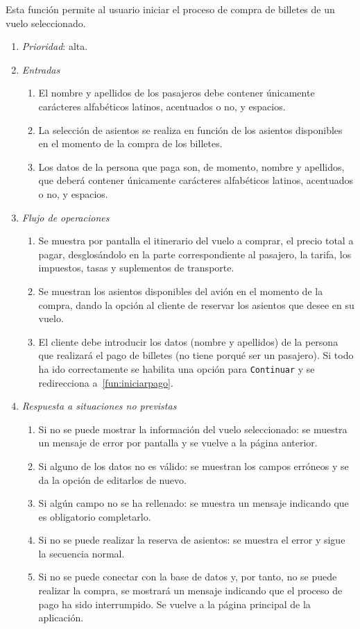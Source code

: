 

 \label{fun:comprarbillete}
	Esta función permite al usuario iniciar el proceso de compra de billetes de un vuelo seleccionado.		

	\begin{enumerate}
		\item \textit{Prioridad}: alta.	
		\item \textit{Entradas}
			\begin{enumerate}
				\item El nombre y apellidos de los pasajeros debe contener únicamente carácteres alfabéticos latinos, acentuados o no, y espacios.
				\item La selección de asientos se realiza en función de los asientos disponibles en el momento de la compra de los billetes.
				\item Los datos de la persona que paga son, de momento, nombre y apellidos,  que deberá contener únicamente carácteres alfabéticos latinos, acentuados o no, y espacios.							
			\end{enumerate}
		\item \textit{Flujo de operaciones}
			\begin{enumerate}
				\item Se muestra por pantalla el itinerario del vuelo a comprar, el precio total a pagar, desglosándolo en la parte correspondiente al pasajero, la tarifa, los impuestos, tasas y suplementos de transporte.
				\item Se muestran los asientos disponibles del avión en el momento de la compra, dando la opción al cliente de reservar los asientos que desee en su vuelo.
				\item El cliente debe introducir los datos (nombre y apellidos) de la persona que realizará el pago de billetes (no tiene porqué ser un pasajero). Si todo ha ido correctamente se habilita una opción para \verb|Continuar| y se redirecciona a~\ref{fun:iniciarpago}.
			\end{enumerate}
		\item \textit{Respuesta a situaciones no previstas}
			\begin{enumerate}
				\item Si no se puede mostrar la información del vuelo seleccionado: se muestra un mensaje de error por pantalla y se vuelve a la página anterior.
				\item Si alguno de los datos no es válido: se muestran los campos erróneos y se da la opción de editarlos de nuevo.
				\item Si algún campo no se ha rellenado: se muestra un mensaje indicando que es obligatorio completarlo.
				\item Si no se puede realizar la reserva de asientos: se muestra el error y sigue la secuencia normal.
				\item Si no se puede conectar con la base de datos y, por tanto, no se puede realizar la compra,  se mostrará un mensaje indicando que el proceso de pago ha sido interrumpido. Se vuelve a la página principal de la aplicación.
			\end{enumerate}
	\end{enumerate}
								
